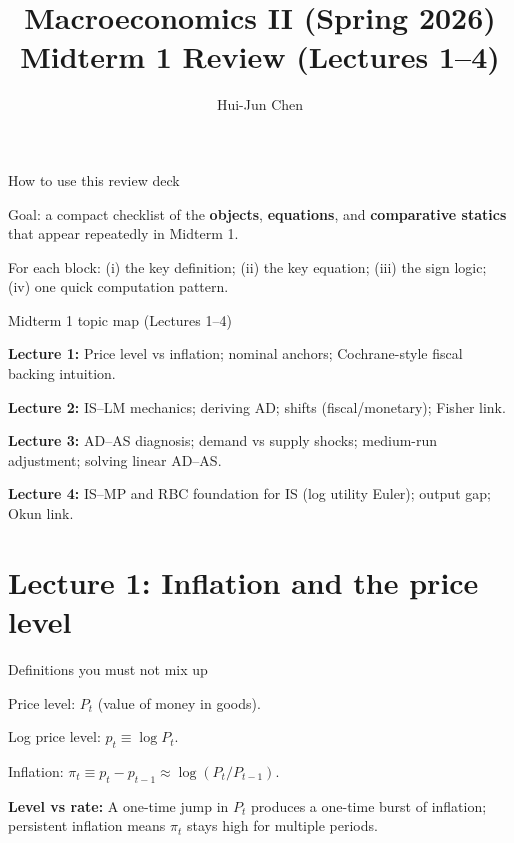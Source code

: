 \documentclass[aspectratio=169,xcolor=dvipsnames]{beamer}
\title[Midterm 1 Review]{Macroeconomics II (Spring 2026)\\\vspace{4pt}Midterm 1 Review (Lectures 1--4)}
\author[Hui-Jun Chen]{Hui-Jun Chen}
\institute[]{National Tsing Hua University}
\date{}
\let\tempone\itemize
\let\temptwo\enditemize
\renewenvironment{itemize}{\tempone\addtolength{\itemsep}{\fill}}{\temptwo}
\let\tempa\enumerate
\let\tempb\endenumerate
\renewenvironment{enumerate}{\tempa\addtolength{\itemsep}{\fill}}{\tempb}
\begin{document}
\begin{frame}
  \titlepage
\end{frame}

\begin{frame}{How to use this review deck}
\begin{itemize}
\item Goal: a compact checklist of the \textbf{objects}, \textbf{equations}, and \textbf{comparative statics} that appear repeatedly in Midterm 1.
\item For each block: (i) the key definition; (ii) the key equation; (iii) the sign logic; (iv) one quick computation pattern.
\end{itemize}
\end{frame}

\begin{frame}{Midterm 1 topic map (Lectures 1--4)}
\begin{enumerate}
\item \textbf{Lecture 1:} Price level vs inflation; nominal anchors; Cochrane-style fiscal backing intuition.
\item \textbf{Lecture 2:} IS--LM mechanics; deriving AD; shifts (fiscal/monetary); Fisher link.
\item \textbf{Lecture 3:} AD--AS diagnosis; demand vs supply shocks; medium-run adjustment; solving linear AD--AS.
\item \textbf{Lecture 4:} IS--MP and RBC foundation for IS (log utility Euler); output gap; Okun link.
\end{enumerate}
\end{frame}

\section[Lecture 1]{Lecture 1: Inflation and the price level}

\begin{frame}{Definitions you must not mix up}
\begin{itemize}
\item Price level: $P_t$ (value of money in goods).
\item Log price level: $p_t\equiv \log P_t$.
\item Inflation: $\pi_t\equiv p_t-p_{t-1}\approx \log(P_t/P_{t-1})$.
\end{itemize}

\begin{itemize}
\item \textbf{Level vs rate:} A one-time jump in $P_t$ produces a one-time burst of inflation; persistent inflation means $\pi_t$ stays high for multiple periods.
\end{itemize}
\end{frame}
\end{document}
